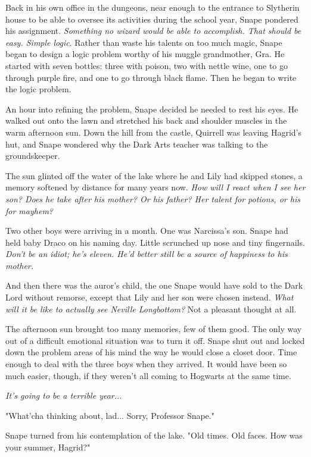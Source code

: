 \documentclass[a4paper,11pt]{article}
\begin{document}
Back in his own office in the dungeons, near enough to the entrance to Slytherin house to be able to oversee its activities during the school year, Snape pondered his assignment. \emph{Something no wizard would be able to accomplish. That should be easy. Simple logic}. Rather than waste his talents on too much magic, Snape began to design a logic problem worthy of his muggle grandmother, Gra. He started with seven bottles: three with poison, two with nettle wine, one to go through purple fire, and one to go through black flame. Then he began to write the logic problem.

An hour into refining the problem, Snape decided he needed to rest his eyes. He walked out onto the lawn and stretched his back and shoulder muscles in the warm afternoon sun. Down the hill from the castle, Quirrell was leaving Hagrid's hut, and Snape wondered why the Dark Arts teacher was talking to the groundskeeper.

The sun glinted off the water of the lake where he and Lily had skipped stones, a memory softened by distance for many years now. \emph{How will I react when I see her son? Does he take after his mother? Or his father? Her talent for potions, or his for mayhem?}

Two other boys were arriving in a month. One was Narcissa's son. Snape had held baby Draco on his naming day. Little scrunched up nose and tiny fingernails. \emph{Don't be an idiot; he's eleven. He'd better still be a source of happiness to his mother.}

And then there was the auror's child, the one Snape would have sold to the Dark Lord without remorse, except that Lily and her son were chosen instead. \emph{What will it be like to actually see Neville Longbottom?} Not a pleasant thought at all.

The afternoon sun brought too many memories, few of them good. The only way out of a difficult emotional situation was to turn it off. Snape shut out and locked down the problem areas of his mind the way he would close a closet door. Time enough to deal with the three boys when they arrived. It would have been so much easier, though, if they weren't all coming to Hogwarts at the same time.

\emph{It's going to be a terrible year...}

"What'cha thinking about, lad... Sorry, Professor Snape."

Snape turned from his contemplation of the lake. "Old times. Old faces. How was your summer, Hagrid?"
\end{document}
